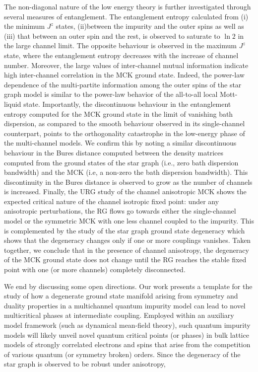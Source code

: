\documentclass[reprint,prb,superscriptaddress]{revtex4-2}
\begin{document}
\par 
The non-diagonal nature of the low energy theory is further investigated through several measures of entanglement. The entanglement entropy calculated from (i) the minimum \(J^z\) states, (ii)between the impurity and the outer spins as well as (iii) that between an outer spin and the rest, is observed to saturate to \(\ln 2\) in the large channel limit. The opposite behaviour is observed in the maximum $J^z$ state, where the entanglement entropy decreases with the increase of channel number. Moreover, the large values of inter-channel mutual information indicate high inter-channel correlation in the MCK ground state.
Indeed, the power-law dependence of the multi-partite information among the outer spins of the star graph model is similar to the power-law behavior of the all-to-all local Mott-liquid state. Importantly, the discontinuous behaviour in the entanglement entropy computed for the MCK ground state in the limit of vanishing bath dispersion, as compared to the smooth behaviour observed in its single-channel counterpart, points to the orthogonality catastrophe in the low-energy phase of the multi-channel models. We confirm this by noting a similar discontinuous behaviour in the Bures distance computed between the density matrices computed from the ground states of the star graph (i.e., zero bath dispersion bandwidth) and the MCK (i.e, a non-zero the bath dispersion bandwidth). This discontinuity in the Bures distance is observed to grow as the number of channels is increased. Finally, the URG study of the channel anisotropic MCK shows the expected critical nature of the channel isotropic fixed point: under any anisotropic perturbations, the RG flows go towards either the single-channel model or the symmetric MCK with one less channel coupled to the impurity. This is complemented by the study of the star graph ground state degeneracy which shows that the degeneracy changes only if one or more couplings vanishes.
Taken together, we conclude that in the presence of channel anisotropy, the degeneracy of the MCK ground state does not change until the RG reaches the stable fixed point with one (or more channels) completely disconnected.
\par 
We end by discussing some open directions. 
Our work presents a template for the study of how a degenerate ground state manifold arising from symmetry and duality properties in a multichannel quantum impurity model can lead to novel multicritical phases at intermediate coupling. Employed within an auxiliary model framework (such as dynamical mean-field theory), such quantum impurity models will likely unveil novel quantum critical points (or phases) in bulk lattice models of strongly correlated electrons and spins that arise from the competition of various quantum (or symmetry broken) orders. Since the degeneracy of the star graph is observed to be robust under anisotropy, 
\end{document}
